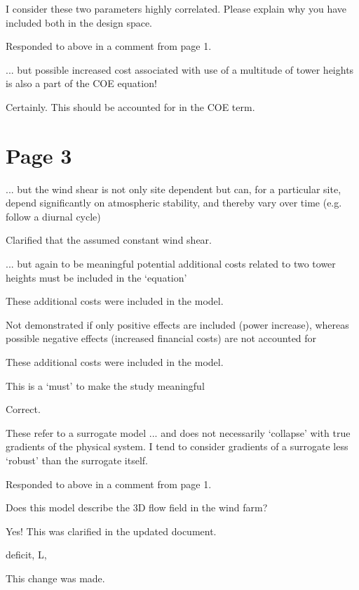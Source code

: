 \documentclass[12pt]{report}
\begin{document}
\bigskip \color{black}
I consider these two parameters highly correlated. Please explain why you have included both in the design space.

\color{blue} Responded to above in a comment from page 1.

\bigskip \color{black}
... but possible increased cost associated with use of a multitude of tower heights is also a part of the COE equation!

\color{blue} Certainly. This should be accounted for in the COE term.

\bigskip \color{black}
\section*{Page 3}
\bigskip \color{black}
... but the wind shear is not only site dependent but can, for a particular site, depend significantly on atmospheric stability, and thereby vary over time (e.g. follow a diurnal cycle)

\color{blue} Clarified that the assumed constant wind shear.

\bigskip \color{black}
... but again to be meaningful potential additional costs related to two tower heights must be included in the `equation'

\color{blue} These additional costs were included in the model.

\bigskip \color{black}
Not demonstrated if only positive effects are included (power increase), whereas possible negative effects (increased financial costs) are not accounted for

\color{blue} These additional costs were included in the model.

\bigskip \color{black}
This is a `must' to make the study meaningful

\color{blue} Correct.

\bigskip \color{black}
These refer to a surrogate model ... and does not necessarily `collapse' with true gradients of the physical system. I tend to consider gradients of a surrogate less `robust' than the surrogate itself.

\color{blue} Responded to above in a comment from page 1.

\bigskip \color{black}
Does this model describe the 3D flow field in the wind farm?

\color{blue} Yes! This was clarified in the updated document.

\bigskip \color{black}
deficit, L,

\color{blue} This change was made.
\end{document}
